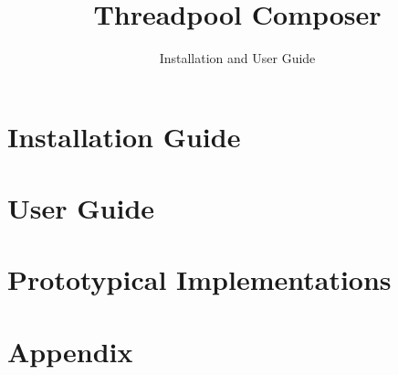 \documentclass[a4paper, oneside, 11pt]{scrreprt}
\title{Threadpool Composer}
\subtitle{Installation and User Guide}
\date{}
\begin{document}
  \maketitle
  
  \tableofcontents

  \chapter{Installation Guide}\label{chp:ig}
  
  \chapter{User Guide}\label{chp:ug}
  
  \chapter{Prototypical Implementations}\label{chp:ex}
  
  \chapter{Appendix}
  
\end{document}
